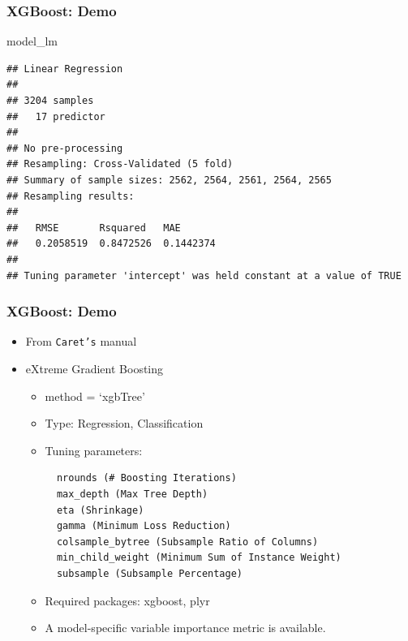\documentclass[
  shownotes,
  xcolor={svgnames},
  hyperref={colorlinks,citecolor=DarkBlue,linkcolor=DarkRed,urlcolor=DarkBlue}
  , aspectratio=169]{beamer}
\newenvironment{Shaded}{\begin{snugshade}}{\end{snugshade}}
\newcommand{\NormalTok}[1]{#1}
\begin{document}
\begin{frame}[fragile]
\frametitle{XGBoost: Demo}


\begin{Shaded}
\begin{Highlighting}[]
\NormalTok{model\_lm}
\end{Highlighting}
\end{Shaded}

\begin{tiny}
\begin{verbatim}
## Linear Regression 
## 
## 3204 samples
##   17 predictor
## 
## No pre-processing
## Resampling: Cross-Validated (5 fold) 
## Summary of sample sizes: 2562, 2564, 2561, 2564, 2565 
## Resampling results:
## 
##   RMSE       Rsquared   MAE      
##   0.2058519  0.8472526  0.1442374
## 
## Tuning parameter 'intercept' was held constant at a value of TRUE
\end{verbatim}
\end{tiny}
\end{frame}
\begin{frame}[fragile]
\frametitle{XGBoost: Demo}
\begin{itemize}
\item From \texttt{Caret's} manual

\item eXtreme Gradient Boosting
\medskip
\begin{itemize}
\item method = `xgbTree'
\medskip
\item Type: Regression, Classification
\medskip
\item Tuning parameters:

  
  \begin{verbatim}
  nrounds (# Boosting Iterations)
  max_depth (Max Tree Depth)
  eta (Shrinkage)
  gamma (Minimum Loss Reduction)
  colsample_bytree (Subsample Ratio of Columns)
  min_child_weight (Minimum Sum of Instance Weight)
  subsample (Subsample Percentage)
  \end{verbatim}



  \item Required packages: xgboost, plyr
  \medskip
  \item A model-specific variable importance metric is available.
\end{itemize}
\end{itemize}

\end{frame}
\end{document}
